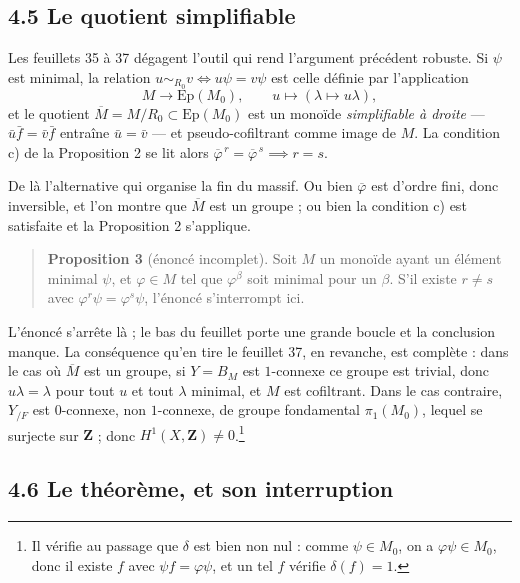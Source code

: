 \documentclass[11pt,a4paper]{article}
\begin{document}
\subsection*{4.5 Le quotient simplifiable}

Les feuillets 35 à 37 dégagent l'outil qui rend l'argument précédent robuste.
Si $\psi$ est minimal, la relation $u \sim_{R_{0}} v \iff u\psi = v\psi$ est
celle définie par l'application
\[
  M \longrightarrow \mathrm{Ep}(M_{0}), \qquad
  u \longmapsto (\lambda \mapsto u\lambda),
\]
et le quotient $\overline{M} = M/R_{0} \subset \mathrm{Ep}(M_{0})$ est un
monoïde \emph{simplifiable à droite} — $\bar{u}\bar{f} = \bar{v}\bar{f}$
entraîne $\bar{u} = \bar{v}$ — et pseudo-cofiltrant comme image de $M$. La
condition c) de la Proposition 2 se lit alors
$\overline{\varphi}^{\,r} = \overline{\varphi}^{\,s} \implies r = s$.

De là l'alternative qui organise la fin du massif. Ou bien
$\overline{\varphi}$ est d'ordre fini, donc inversible, et l'on montre que
$\overline{M}$ est un groupe ; ou bien la condition c) est satisfaite et la
Proposition 2 s'applique.

\begin{quote}
\textbf{Proposition 3} (énoncé incomplet). Soit $M$ un monoïde ayant un
élément minimal $\psi$, et $\varphi \in M$ tel que $\varphi^{\beta}$ soit
minimal pour un $\beta$. S'il existe $r \neq s$ avec
$\varphi^{r}\psi = \varphi^{s}\psi$, l'énoncé s'interrompt ici.
\end{quote}

L'énoncé s'arrête là ; le bas du feuillet porte une grande boucle et la
conclusion manque. La conséquence qu'en tire le feuillet 37, en revanche, est complète :
dans le cas où $\overline{M}$ est un groupe, si $Y = B_{M}$ est $1$-connexe ce
groupe est trivial, donc $u\lambda = \lambda$ pour tout $u$ et tout $\lambda$
minimal, et $M$ est cofiltrant. Dans le cas contraire, $Y_{/F}$ est
$0$-connexe, non $1$-connexe, de groupe fondamental $\pi_{1}(M_{0})$, lequel
se surjecte sur $\mathbf{Z}$ ; donc $H^{1}(X,\mathbf{Z}) \neq 0$.\footnote{Il
vérifie au passage que $\delta$ est bien non nul : comme $\psi \in M_{0}$, on a
$\varphi\psi \in M_{0}$, donc il existe $f$ avec $\psi f = \varphi\psi$, et un
tel $f$ vérifie $\delta(f) = 1$.}

\subsection*{4.6 Le théorème, et son interruption}
\end{document}
